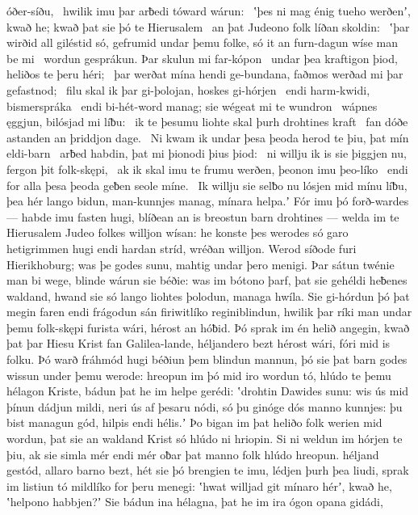 óðer-síðu, \hld\ hwilik imu þar arƀedi
tóward wárun: \hld\ ʽþes ni mag énig tueho werðenʼ, kwað he;
kwað þat sie þó te Hierusalem \hld\ an þat Judeono folk
líðan skoldin: \hld\ ʽþar wirðid all giléstid só,
gefrumid undar þemu folke, só it an furn-dagun
wíse man be mi \hld\ wordun gesprákun.
Þar skulun mi far-kópon \hld\ undar þea kraftigon þiod,
heliðos te þeru héri; \hld\ þar werðat mína hendi ge-bundana,
faðmos werðad mi þar gefastnod; \hld\ filu skal ik þar gi-þolojan,
hoskes gi-hórjen \hld\ endi harm-kwidi,
bismerspráka \hld\ endi bi-hét-word manag;
sie wégeat mi te wundron \hld\ wápnes ęggjun,
bilósjad mi líƀu: \hld\ ik te þesumu liohte skal
þurh drohtines kraft \hld\ fan dóðe astanden
an þriddjon dage. \hld\ Ni kwam ik undar þesa þeoda herod
te þiu, þat mín eldi-barn \hld\ arƀed habdin,
þat mi þionodi þius þiod: \hld\ ni willju ik is sie þiggjen nu,
fergon þit folk-skępi, \hld\ ak ik skal imu te frumu werðen,
þeonon imu þeo-líko \hld\ endi for alla þesa þeoda geƀen
seole míne. \hld\ Ik willju sie selƀo nu
lósjen mid mínu líƀu, þea hér lango bidun,
man-kunnjes manag, mínara helpa.ʼ
Fór imu þó forð-wardes — habde imu fasten hugi,
blíðean an is breostun barn drohtines —
welda im te Hierusalem Judeo folkes
willjon wísan: he konste þes werodes só garo
hetigrimmen hugi endi hardan stríd,
wréðan willjon. Werod síðode
furi Hierikhoburg; was þe godes sunu,
mahtig undar þero menigi. Þar sátun twénie man bi wege,
blinde wárun sie béðie: was im bótono þarf,
þat sie gehéldi heƀenes waldand,
hwand sie só lango liohtes þolodun,
managa hwíla. Sie gi-hórdun þó þat megin faren
endi frágodun sán firiwitlíko
reginiblindun, hwilik þar ríki man
undar þemu folk-skępi furista wári,
hérost an hóƀid. Þó sprak im én helið angegin,
kwað þat þar Hiesu Krist fan Galilea-lande,
héljandero bezt hérost wári,
fóri mid is folku. Þó warð fráhmód hugi
béðiun þem blindun mannun, þó sie þat barn godes
wissun under þemu werode: hreopun im þó mid iro wordun tó,
hlúdo te þemu hélagon Kriste, bádun þat he im helpe gerédi:
ʽdrohtin Dawides sunu: wis ús mid þínun dádjun mildi,
neri ús af þesaru nódi, só þu ginóge dós
manno kunnjes: þu bist managun gód,
hilpis endi hélis.ʼ Þo bigan im þat heliðo folk
werien mid wordun, þat sie an waldand Krist
só hlúdo ni hriopin. Si ni weldun im hórjen te þiu,
ak sie simla mér endi mér oƀar þat manno folk
hlúdo hreopun. héljand gestód,
allaro barno bezt, hét sie þó brengien te imu,
lédjen þurh þea liudi, sprak im listiun tó
mildlíko for þeru menegi: ʽhwat willjad git mínaro hérʼ, kwað he,
ʽhelpono habbjen?ʼ Sie bádun ina hélagna,
þat he im ira ógon opana gidádi,
